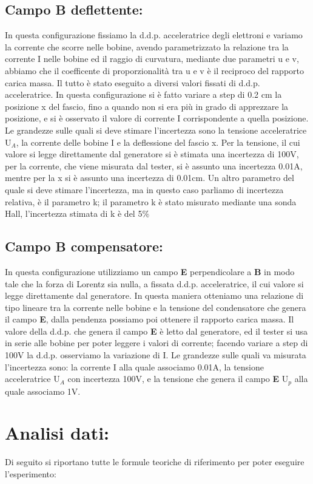 \documentclass{article}
\begin{document}
\subsection{Campo \textbf{B} deflettente:}
In questa configurazione fissiamo la d.d.p. acceleratrice degli elettroni e variamo la corrente che scorre nelle bobine, avendo parametrizzato la relazione tra la corrente I nelle bobine ed il raggio di curvatura, mediante due parametri u e v, abbiamo che il coefficente di proporzionalità tra u e v è il reciproco del rapporto carica massa. Il tutto è stato eseguito a diversi valori fissati di d.d.p. acceleratrice. In questa configurazione si è fatto variare a step di 0.2 cm la posizione x del fascio, fino a quando non si era più in grado di apprezzare la posizione, e si è osservato il valore di corrente I corrispondente a quella posizione.
Le grandezze sulle quali si deve stimare l'incertezza sono la tensione acceleratrice U$_{A}$, la corrente delle bobine I e la deflessione del fascio x. Per la tensione, il cui valore si legge direttamente dal generatore si è stimata una incertezza di 100V, per la corrente, che viene misurata dal tester, si è assunto una incertezza 0.01A, mentre per la x si è assunto una incertezza di 0.01cm. Un altro parametro del quale si deve stimare l'incertezza, ma in questo caso parliamo di incertezza relativa, è il parametro k; il parametro k è stato misurato mediante una sonda Hall, l'incertezza stimata di k è del 5$\%$
\subsection{Campo \textbf{B} compensatore:}
In questa configurazione utilizziamo un campo \textbf{E} perpendicolare a \textbf{B} in modo tale che la forza di Lorentz sia nulla, a fissata d.d.p. acceleratrice, il cui valore si legge direttamente dal generatore. In questa maniera otteniamo una relazione di tipo lineare tra la corrente nelle bobine  e la tensione del condensatore che genera il campo \textbf{E}, dalla pendenza possiamo poi ottenere il rapporto carica massa. Il valore della d.d.p. che genera il campo \textbf{E} è letto dal generatore, ed il tester si usa in serie alle bobine per poter leggere i valori di corrente; facendo variare a step di 100V la d.d.p. osserviamo la variazione di I. 
Le grandezze sulle quali va misurata l'incertezza sono: la corrente I alla quale associamo 0.01A, la tensione acceleratrice U$_{A}$ con incertezza 100V, e la tensione che genera il campo \textbf{E} U$_{p}$ alla quale associamo 1V.
~
\section{Analisi dati:}
Di seguito si riportano tutte le formule teoriche di riferimento per poter eseguire l'esperimento:
\end{document}
